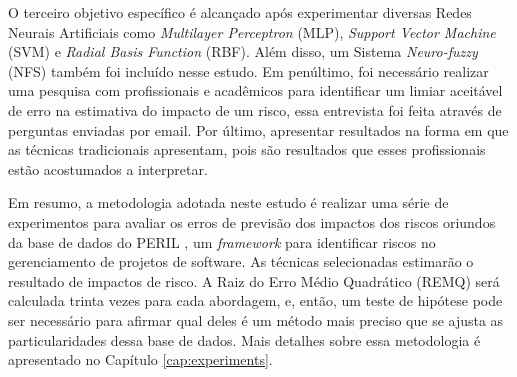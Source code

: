 O terceiro objetivo específico é alcançado após experimentar diversas Redes Neurais Artificiais como \textit{Multilayer Perceptron} (MLP), \textit{Support Vector Machine} (SVM) e \textit{Radial Basis Function} (RBF). Além disso, um Sistema \textit{Neuro-fuzzy} (NFS) também foi incluído nesse estudo. Em penúltimo, foi necessário realizar uma pesquisa com profissionais e acadêmicos para identificar um limiar aceitável de erro na estimativa do impacto de um risco, essa entrevista foi feita através de perguntas enviadas por email. Por último, apresentar resultados na forma em que as técnicas tradicionais apresentam, pois são resultados que esses profissionais estão acostumados a interpretar.

Em resumo, a metodologia adotada neste estudo é realizar uma série de experimentos para avaliar os erros de previsão dos impactos dos riscos oriundos da base de dados do PERIL \cite{kendrick2003identifying}, um \textit{framework} para identificar riscos no gerenciamento de projetos de software. As técnicas selecionadas estimarão o resultado de impactos de risco. A Raiz do Erro Médio Quadrático (REMQ) será calculada trinta vezes para cada abordagem, e, então, um teste de hipótese pode ser necessário para afirmar qual deles é um método mais preciso que se ajusta as particularidades dessa base de dados. Mais detalhes sobre essa metodologia é apresentado no Capítulo \ref{cap:experiments}.


